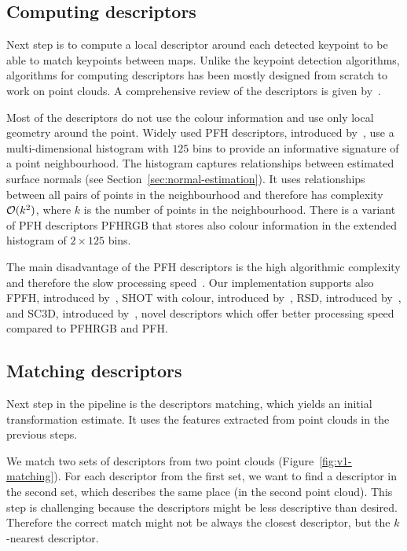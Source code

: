 \subsection{Computing descriptors}
\label{sec:compute-descriptors}

Next step is to compute a local descriptor around each detected keypoint to be able to match keypoints between maps. Unlike the keypoint detection algorithms, algorithms for computing descriptors has been mostly designed from scratch to work on point clouds. A comprehensive review of the descriptors is given by~\citet{YasirThesis}.

Most of the descriptors do not use the colour information and use only local geometry around the point. Widely used \gls{PFH} descriptors, introduced by~\citet{rusu2008pfh}, use a multi-dimensional histogram with $125$ bins to provide an informative signature of a point neighbourhood. The histogram captures relationships between estimated surface normals (see Section~\ref{sec:normal-estimation}). It uses relationships between all pairs of points in the neighbourhood and therefore has complexity $\operatorname{\mathcal{O}}(k^2)$, where $k$ is the number of points in the neighbourhood. There is a variant of \gls{PFH} descriptors \gls{PFHRGB} that stores also colour information in the extended histogram of $2 \times 125$ bins.

The main disadvantage of the \gls{PFH} descriptors is the high algorithmic complexity and therefore the slow processing speed~\citep{rusu2009fpfh}. Our implementation supports also \gls{FPFH}, introduced by~\citet{rusu2009fpfh}, \gls{SHOT} with colour, introduced by~\citet{tombari2011shot}, \gls{RSD}, introduced by~\citet{marton2010rsd}, and \gls{SC3D}, introduced by~\citet{frome2004sc3d}, novel descriptors which offer better processing speed compared to \gls{PFHRGB} and \gls{PFH}.

\subsection{Matching descriptors}
\label{sec:matching}

Next step in the pipeline is the descriptors matching, which yields an initial transformation estimate. It uses the features extracted from point clouds in the previous steps.

We match two sets of descriptors from two point clouds (Figure~\ref{fig:v1-matching}). For each descriptor from the first set, we want to find a descriptor in the second set, which describes the same place (in the second point cloud). This step is challenging because the descriptors might be less descriptive than desired. Therefore the correct match might not be always the closest descriptor, but the $k$-nearest descriptor.

